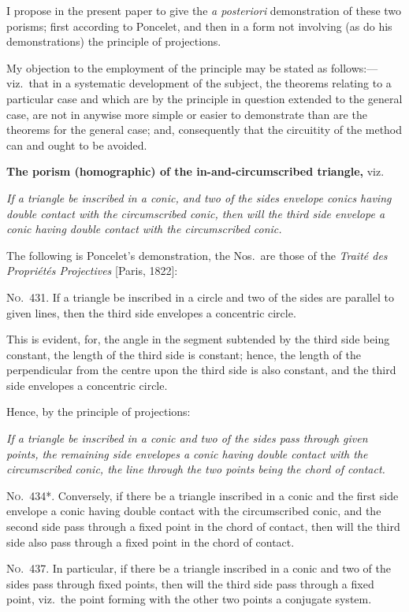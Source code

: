 \documentclass[12pt,a4paper]{article}
\theoremstyle{plain}
\theoremstyle{definition}
\begin{document}
I propose in the present paper to give the \textit{a posteriori} demonstration of these two porisms; first according to Poncelet, and then in a form not involving (as do his demonstrations) the principle of projections.

My objection to the employment of the principle may be stated as follows:---viz.\ that in a systematic development of the subject, the theorems relating to a particular case and which are by the principle in question extended to the general case, are not in anywise more simple or easier to demonstrate than are the theorems for the general case; and, consequently that the circuitity of the method can and ought to be avoided.

\textbf{The porism (homographic) of the in-and-circumscribed triangle,} viz.

\textit{If a triangle be inscribed in a conic, and two of the sides envelope conics having double contact with the circumscribed conic, then will the third side envelope a conic having double contact with the circumscribed conic.}

The following is Poncelet's demonstration, the Nos.\ are those of the \textit{Trait\'{e} des Propri\'{e}t\'{e}s Projectives} [Paris, 1822]:

\textsc{No.~431.} If a triangle be inscribed in a circle and two of the sides are parallel to given lines, then the third side envelopes a concentric circle.

This is evident, for, the angle in the segment subtended by the third side being constant, the length of the third side is constant; hence, the length of the perpendicular from the centre upon the third side is also constant, and the third side envelopes a concentric circle.

Hence, by the principle of projections:

\textit{If a triangle be inscribed in a conic and two of the sides pass through given points, the remaining side envelopes a conic having double contact with the circumscribed conic, the line through the two points being the chord of contact.}

\textsc{No.~434*.} Conversely, if there be a triangle inscribed in a conic and the first side envelope a conic having double contact with the circumscribed conic, and the second side pass through a fixed point in the chord of contact, then will the third side also pass through a fixed point in the chord of contact.

\textsc{No.~437.} In particular, if there be a triangle inscribed in a conic and two of the sides pass through fixed points, then will the third side pass through a fixed point, viz.\ the point forming with the other two points a conjugate system.
\end{document}
